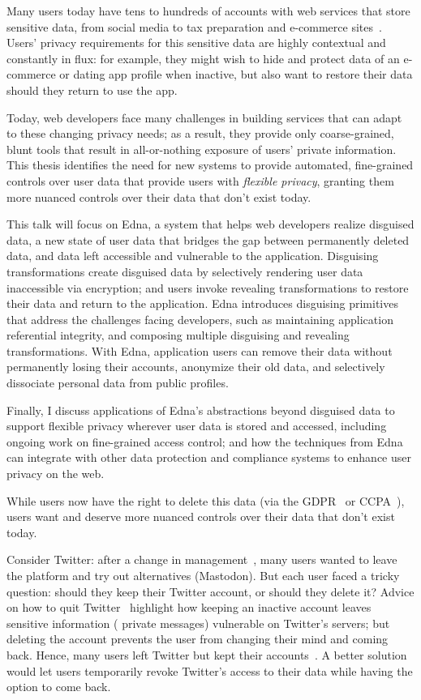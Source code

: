 Many users today have tens to hundreds of accounts with web services that
store sensitive data, from social media to tax preparation and e-commerce
sites~\cite{tens,hundreds,password_life_cycle}.
%
Users' privacy requirements for this sensitive data are highly contextual and
constantly in flux: for example, they might wish to hide and protect data of an
e-commerce or dating app profile when inactive, but also want to restore their
data should they return to use the app. 

Today, web developers face many challenges in building services that can adapt
to these changing privacy needs; as a result, they provide only coarse-grained,
blunt tools that result in all-or-nothing exposure of users’ private
information. This thesis identifies the need for new systems to provide
automated, fine-grained controls over user data that provide users with
\emph{flexible privacy}, granting them more nuanced controls over their data
that don't exist today.

This talk will focus on Edna, a system that helps web developers realize
disguised data, a new state of user data that bridges the gap between
permanently deleted data, and data left accessible and vulnerable to the
application. Disguising transformations create disguised data by selectively
rendering user data inaccessible via encryption; and users invoke revealing
transformations to restore their data and return to the application. Edna
introduces disguising primitives that address the challenges facing developers,
such as maintaining application referential integrity, and composing multiple
disguising and revealing transformations. With Edna, application users can
remove their data without permanently losing their accounts, anonymize their old
data, and selectively dissociate personal data from public profiles.

Finally, I discuss applications of Edna’s abstractions beyond disguised data to
support flexible privacy wherever user data is stored and accessed, including
ongoing work on fine-grained access control; and how the techniques from Edna
can integrate with other data protection and compliance systems to enhance user
privacy on the web.


While users now have the right to delete this data (via \eg the
GDPR~\cite{eu:gdpr} or CCPA~\cite{ccpa}), users want and deserve more nuanced
controls over their data that don't exist today.

Consider Twitter: after a change in management~\cite{musk-twitter}, many users
wanted to leave the platform and try out alternatives
(\eg Mastodon).
But each user faced a tricky question: should they
keep their Twitter account, or should they delete it?
%
Advice on how to quit Twitter~\cite{quit-twitter-india,
quit-twitter-mash}
highlight how keeping an inactive account leaves sensitive information (\eg
private messages) vulnerable on Twitter's servers; but
deleting the account prevents the user from changing their mind and coming back.
Hence, many users left Twitter but kept their
accounts~\cite{nbc-twitter,shondarhimes,kenolin}.
%
A better solution would let users temporarily revoke Twitter's access to
their data while having the option to come back.

